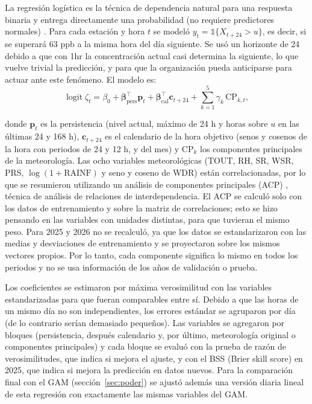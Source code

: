 \documentclass[11pt]{article}
\begin{document}
La regresión logística es la técnica de dependencia natural para una respuesta binaria y entrega directamente una probabilidad (no requiere predictores normales) \citep{hosmer2013}. Para cada estación y hora $t$ se modeló $y_t=\mathbb{1}\{X_{t+24}>u\}$, es decir, si se superará 63 ppb a la misma hora del día siguiente. Se usó un horizonte de 24 debido a que con 1hr la concentración actual casi determina la siguiente, lo que vuelve trivial la predicción, y para que la organización pueda anticiparse para actuar ante este fenómeno. El modelo es:
\begin{equation}
\operatorname{logit}\zeta_t = \beta_0 + \boldsymbol{\beta}_{\text{pers}}^{\top}\mathbf{p}_t + \boldsymbol{\beta}_{\text{cal}}^{\top}\mathbf{c}_{t+24} + \textstyle\sum_{k=1}^{5}\gamma_k\,\mathrm{CP}_{k,t},
\label{eq:logit}
\end{equation}

donde $\mathbf{p}_t$ es la persistencia (nivel actual, máximo de 24 h y horas sobre $u$ en las últimas 24 y 168 h), $\mathbf{c}_{t+24}$ es el calendario de la hora objetivo (senos y cosenos de la hora con periodos de 24 y 12 h, y del mes) y $\mathrm{CP}_k$ los componentes principales de la meteorología. Las ocho variables meteorológicas (TOUT, RH, SR, WSR, PRS, $\log(1+\text{RAINF})$ y seno y coseno de WDR) están correlacionadas, por lo que se resumieron utilizando un análisis de componentes principales (ACP) \citep{jolliffe2016}, técnica de análisis de relaciones de interdependencia. El ACP se calculó solo con los datos de entrenamiento y sobre la matriz de correlaciones; esto se hizo pensando en las variables con unidades distintas, para que tuvieran el mismo peso. Para 2025 y 2026 no se recalculó, ya que los datos se estandarizaron con las medias y desviaciones de entrenamiento y se proyectaron sobre los mismos vectores propios. Por lo tanto, cada componente significa lo mismo en todos los periodos y no se usa información de los años de validación o prueba.

Los coeficientes se estimaron por máxima verosimilitud con las variables estandarizadas para que fueran comparables entre sí. Debido a que las horas de un mismo día no son independientes, los errores estándar se agruparon por día (de lo contrario serían demasiado pequeños). Las variables se agregaron por bloques (persistencia, después calendario y, por último, meteorología original o componentes principales) y cada bloque se evaluó con la prueba de razón de verosimilitudes, que indica si mejora el ajuste, y con el BSS (Brier skill score) en 2025, que indica si mejora la predicción en datos nuevos. Para la comparación final con el GAM (sección~\ref{sec:poder}) se ajustó además una versión diaria lineal de esta regresión con exactamente las mismas variables del GAM.
\end{document}
